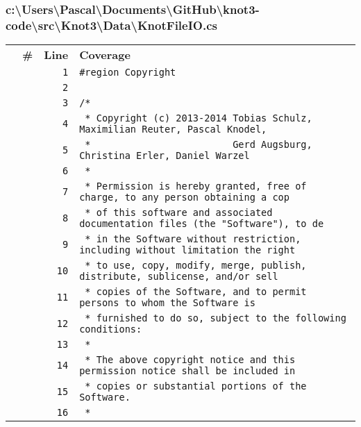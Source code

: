 \documentclass[a4paper,10pt]{article}
\begin{document}
\subsubsection{c:\textbackslash Users\textbackslash Pascal\textbackslash Documents\textbackslash GitHub\textbackslash knot3-code\textbackslash src\textbackslash Knot3\textbackslash Data\textbackslash KnotFileIO.cs}
\begin{longtable}[l]{lrrl}
\textbf{} & \textbf{\#} & \textbf{Line} & \textbf{Coverage}\\
\cellcolor{gray} &  & \verb~1~ & \verb~#region Copyright~\\
\cellcolor{gray} &  & \verb~2~ & \verb~~\\
\cellcolor{gray} &  & \verb~3~ & \verb~/*~\\
\cellcolor{gray} &  & \verb~4~ & \verb~ * Copyright (c) 2013-2014 Tobias Schulz, Maximilian Reuter, Pascal Knodel,~\\
\cellcolor{gray} &  & \verb~5~ & \verb~ *                         Gerd Augsburg, Christina Erler, Daniel Warzel~\\
\cellcolor{gray} &  & \verb~6~ & \verb~ *~\\
\cellcolor{gray} &  & \verb~7~ & \verb~ * Permission is hereby granted, free of charge, to any person obtaining a cop~\\
\cellcolor{gray} &  & \verb~8~ & \verb~ * of this software and associated documentation files (the "Software"), to de~\\
\cellcolor{gray} &  & \verb~9~ & \verb~ * in the Software without restriction, including without limitation the right~\\
\cellcolor{gray} &  & \verb~10~ & \verb~ * to use, copy, modify, merge, publish, distribute, sublicense, and/or sell~\\
\cellcolor{gray} &  & \verb~11~ & \verb~ * copies of the Software, and to permit persons to whom the Software is~\\
\cellcolor{gray} &  & \verb~12~ & \verb~ * furnished to do so, subject to the following conditions:~\\
\cellcolor{gray} &  & \verb~13~ & \verb~ *~\\
\cellcolor{gray} &  & \verb~14~ & \verb~ * The above copyright notice and this permission notice shall be included in ~\\
\cellcolor{gray} &  & \verb~15~ & \verb~ * copies or substantial portions of the Software.~\\
\cellcolor{gray} &  & \verb~16~ & \verb~ *~\\

\end{longtable}
\end{document}
